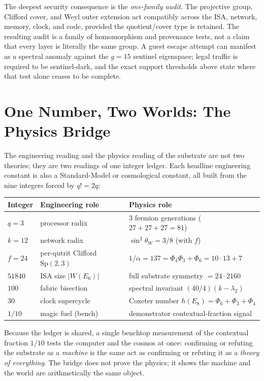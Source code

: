 \documentclass[11pt]{article}
\begin{document}
The deepest security consequence is the \emph{one-family audit}.  The projective group, Clifford cover,
and Weyl outer extension act compatibly across the ISA, network, memory, clock, and code, provided the
quotient/cover type is retained.  The resulting audit is a family of homomorphism and provenance tests,
not a claim that every layer is literally the same group.  A guest escape attempt can manifest as a
spectral anomaly against the $g=15$ sentinel eigenspace; legal traffic is required to be sentinel-dark,
and the exact support thresholds above state where that test alone ceases to be complete.

\section{One Number, Two Worlds: The Physics Bridge}
\label{sec:physics}
The engineering reading and the physics reading of the substrate are not two theories; they are two
readings of one integer ledger. Each headline engineering constant is also a Standard-Model or
cosmological constant, all built from the nine integers forced by $q!=2q$:

\begin{center}
\begin{tabular}{l l l}
\toprule
Integer & Engineering role & Physics role\\
\midrule
$q=3$ & processor radix & $3$ fermion generations ($27{+}27{+}27 = 81$)\\
$k=12$ & network radix & $\sin^2\theta_W = 3/8$ (with $f$)\\
$f=24$ & per-qutrit Clifford $\mathrm{Sp}(2,3)$ & $1/\alpha = 137 = \Phi_4\Phi_3+\Phi_6 = 10\cdot13+7$\\
$51840$ & ISA size $|W(E_6)|$ & full substrate symmetry $=24\cdot2160$\\
$100$ & fabric bisection & spectral invariant $(40/4)(k-\lambda_2)$\\
$30$ & clock supercycle & Coxeter number $h(E_8)=\Phi_6+\Phi_3+\Phi_4$\\
$1/10$ & magic fuel (bench) & demonstrator contextual-fraction signal\\
\bottomrule
\end{tabular}
\end{center}

Because the ledger is shared, a single benchtop measurement of the contextual fraction $1/10$ tests the
computer and the cosmos at once: confirming or refuting the substrate as a \emph{machine} is the same
act as confirming or refuting it as a \emph{theory of everything}. The bridge does not prove the
physics; it shows the machine and the world are arithmetically the same object.
\end{document}
